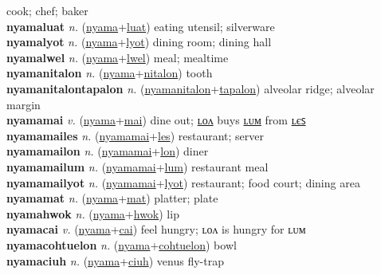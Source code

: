 cook; chef; baker \label{nyamaloncyaukiles} \\
\textbf{nyamaluat} \textit{n.} (\hyperref[nyama]{nyama}+\hyperref[luat]{luat})
eating utensil; silverware \label{nyamaluat} \\
\textbf{nyamalyot} \textit{n.} (\hyperref[nyama]{nyama}+\hyperref[lyot]{lyot})
dining room; dining hall \label{nyamalyot} \\
\textbf{nyamalwel} \textit{n.} (\hyperref[nyama]{nyama}+\hyperref[lwel]{lwel})
meal; mealtime \label{nyamalwel} \\
\textbf{nyamanitalon} \textit{n.} (\hyperref[nyama]{nyama}+\hyperref[nitalon]{nitalon})
tooth \label{nyamanitalon} \\
\textbf{nyamanitalontapalon} \textit{n.} (\hyperref[nyamanitalon]{nyamanitalon}+\hyperref[tapalon]{tapalon})
alveolar ridge; alveolar margin \label{nyamanitalontapalon} \\
\textbf{nyamamai} \textit{v.} (\hyperref[nyama]{nyama}+\hyperref[mai]{mai})
dine out; \hyperref[nyamamailon]{ʟᴏᴧ} buys \hyperref[nyamamailum]{ʟᴜᴍ} from \hyperref[nyamamailes]{ʟєꜱ} \label{nyamamai} \\
\textbf{nyamamailes} \textit{n.} (\hyperref[nyamamai]{nyamamai}+\hyperref[les]{les})
restaurant; server \label{nyamamailes} \\
\textbf{nyamamailon} \textit{n.} (\hyperref[nyamamai]{nyamamai}+\hyperref[lon]{lon})
diner \label{nyamamailon} \\
\textbf{nyamamailum} \textit{n.} (\hyperref[nyamamai]{nyamamai}+\hyperref[lum]{lum})
restaurant meal \label{nyamamailum} \\
\textbf{nyamamailyot} \textit{n.} (\hyperref[nyamamai]{nyamamai}+\hyperref[lyot]{lyot})
restaurant; food court; dining area \label{nyamamailyot} \\
\textbf{nyamamat} \textit{n.} (\hyperref[nyama]{nyama}+\hyperref[mat]{mat})
platter; plate \label{nyamamat} \\
\textbf{nyamahwok} \textit{n.} (\hyperref[nyama]{nyama}+\hyperref[hwok]{hwok})
lip \label{nyamahwok} \\
\textbf{nyamacai} \textit{v.} (\hyperref[nyama]{nyama}+\hyperref[cai]{cai})
feel hungry; ʟᴏᴧ is hungry for ʟᴜᴍ \label{nyamacai} \\
\textbf{nyamacohtuelon} \textit{n.} (\hyperref[nyama]{nyama}+\hyperref[cohtuelon]{cohtuelon})
bowl \label{nyamacohtuelon} \\
\textbf{nyamaciuh} \textit{n.} (\hyperref[nyama]{nyama}+\hyperref[ciuh]{ciuh})
venus fly-trap \label{nyamaciuh} \\
